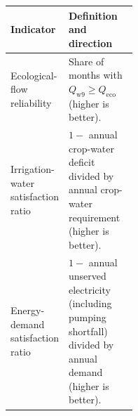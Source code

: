 \documentclass [a4paper,fleqn] {cas-dc}
\begin{document}
\noindent\begin{minipage}{\dimexpr(\textwidth-\columnsep)/2\relax}
\makeatletter{}\makeatother
\caption{System performance indicators}
\label{tab:system-performance-indicators}
\centering
\footnotesize
\setlength{\tabcolsep}{3pt}
\renewcommand{\arraystretch}{1.10}
\begin{tabularx}{\linewidth}{@{}>{\raggedright\arraybackslash}p{0.36\linewidth}
  >{\raggedright\arraybackslash}X@{}}
\toprule
Indicator & Definition and direction \\
\midrule
Ecological-flow reliability & Share of months with
$Q_{\mathrm{w9}}\geq Q_{\mathrm{eco}}$ (higher is better). \\
Irrigation-water satisfaction ratio & $1-$ annual crop-water deficit divided by
annual crop-water requirement (higher is better). \\
Energy-demand satisfaction ratio & $1-$ annual unserved electricity (including
pumping shortfall) divided by annual demand (higher is better). \\
\bottomrule
\end{tabularx}
\end{minipage}
\par\medskip

\end{document}
